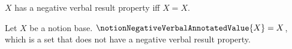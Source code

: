 

\begin{definition}\label{notion_negative_result_has_property}
    $X$ has a negative verbal result property iff $X=X$.
\end{definition}

\begin{definition}\label{notion_negative_verbal_annotated_value}
    Let $X$ be a notion base.
    $\notionNegativeVerbalAnnotatedValue{X}=X$, which is a set
        that does not have a negative verbal result property.
\end{definition}
